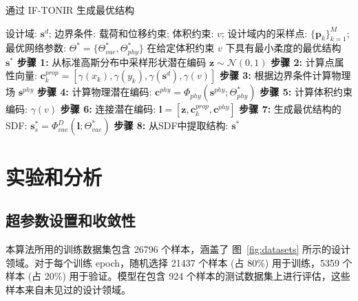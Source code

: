 \begin{algorithm}[htbp]
    \caption{通过 IF-TONIR 生成最优结构}
    \label{alg:algorithm2}
    \begin{algorithmic}[1]
        \REQUIRE 设计域: $\mathbf{s}^d$; 边界条件: 载荷和位移约束; 体积约束: $v$; 设计域内的采样点: $\{\mathbf{p}_k\}_{k=1}^M$; 最优网络参数: $\Theta^*=\{\Theta^*_{vae}, \Theta^*_{phy}\}$
        \ENSURE 在给定体积约束 $v$ 下具有最小柔度的最优结构 $\mathbf{s}^*$
        \STATE \textbf{步骤 1:} 从标准高斯分布中采样形状潜在编码 $\mathbf{z}\sim\mathcal{N}(0, 1)$
        \STATE \textbf{步骤 2:} 计算点属性向量: $\mathbf{c}^{prop}_{k}=[\gamma(x_k),\gamma(y_k),\gamma(\mathbf{s}^{d}),\gamma(v)]$
        \STATE \textbf{步骤 3:} 根据边界条件计算物理场 $\mathbf{s}^{phy}$
        \STATE \textbf{步骤 4:} 计算物理潜在编码: $\mathbf{c}^{phy}=\Phi_{phy}(\mathbf{s}^{phy}; \Theta^*_{phy})$
        \STATE \textbf{步骤 5:} 计算体积约束编码: $\gamma(v)$
        \STATE \textbf{步骤 6:} 连接潜在编码: $\mathbf{l}=[\mathbf{z}, \mathbf{c}^{prop}_k, \mathbf{c}^{phy}]$
        \STATE \textbf{步骤 7:} 生成最优结构的SDF: $\mathbf{s}_s^*=\Phi^D_{vae}(\mathbf{l}; \Theta^*_{vae})$
        \STATE \textbf{步骤 8:} 从SDF中提取结构: $\mathbf{s}^*$
    \end{algorithmic}
\end{algorithm}

\section{实验和分析}

\subsection{超参数设置和收敛性}
本算法所用的训练数据集包含 26796 个样本，涵盖了 图~\ref{fig:datasets} 所示的设计领域。对于每个训练 epoch，随机选择 21437 个样本 (占 80\%) 用于训练，5359 个样本 (占 20\%) 用于验证。模型在包含 924 个样本的测试数据集上进行评估，这些样本来自未见过的设计领域。


